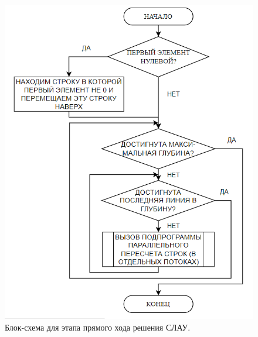 \documentclass{altsu-bachelor}
\begin{document}
\begin{figure}[H]
    \centering
    \includegraphics[scale=0.9]{straight.png}
    \caption{Блок-схема для этапа прямого хода решения СЛАУ.}
    \label{fig:straight}
\end{figure}
\end{document}
